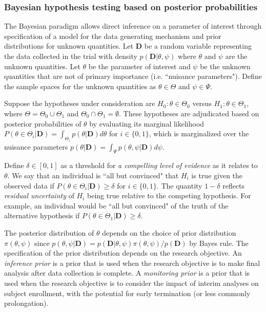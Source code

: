 \documentclass[12pt]{article}
\begin{document}
\subsubsection{Bayesian hypothesis testing based on posterior probabilities}

The Bayesian paradigm allows direct inference on a parameter of interest through specification of a model for the data generating mechanism and prior distributions for unknown quantities. Let $\mathbf{D}$ be a random variable representing the data collected in the trial with density $p(\mathbf{D}|\theta,\psi)$ where $\theta$ and $\psi$ are the unknown quantities. Let $\theta$ be the parameter of interest and $\psi$ be the unknown quantities that are not of primary importance (i.e. ``nuisance parameters"). Define the sample spaces for the unknown quantities as $\theta\in\Theta$ and $\psi\in\Psi$. 

Suppose the hypotheses under consideration are $H_0:\theta\in\Theta_0$ versus $H_1:\theta\in\Theta_1$, where $\Theta=\Theta_0\cup \Theta_1$ and $\Theta_0\cap \Theta_1=\emptyset$. These hypotheses are adjudicated based on posterior probabilities of $\theta$ by evaluating its marginal likelihood $P(\theta\in\Theta_i|\mathbf{D})=\int_{\Theta_i}p(\theta|\mathbf{D})d\theta$ for $i\in\{0,1\}$, which is marginalized over the nuisance parameters $p(\theta|\mathbf{D})=\int_{\Psi}p(\theta,\psi|\mathbf{D})d\psi$. 

Define $\delta\in[0,1]$ as a threshold for \textit{a compelling level of evidence} as it relates to $\theta$. We say that an individual is ``all but convinced" that $H_i$ is true given the observed data if $P(\theta\in\Theta_i|\mathbf{D})\geq\delta$ for $i\in\{0,1\}$. The quantity $1-\delta$ reflects \textit{residual uncertainty} of $H_i$ being true relative to the competing hypothesis. For example, an individual would be ``all but convinced" of the truth of the alternative hypothesis if $P(\theta\in\Theta_1|\mathbf{D})\geq\delta$.

The posterior distribution of $\theta$ depends on the choice of prior distribution $\pi(\theta,\psi)$ since $p(\theta,\psi|\mathbf{D})=p(\mathbf{D}|\theta,\psi)\pi(\theta,\psi)/p(\mathbf{D})$ by Bayes rule. The specification of the prior distribution depends on the research objective. An \textit{inference prior} is a prior that is used when the research objective is to make final analysis after data collection is complete. A \textit{monitoring prior} is a prior that is used when the research objective is to consider the impact of interim analyses on subject enrollment, with the potential for early termination (or less commonly prolongation).
\end{document}
